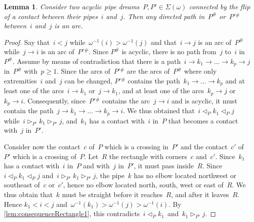 \documentclass[reqno]{amsart}
\newtheorem{lemma}[theorem]{Lemma}
\theoremstyle{definition}
\newcommand{\contact}{^\#} %
\newcommand{\acyclicPipeDreams}{\Sigma} %
\newcommand{\less}{\vartriangleleft} %
\newcommand{\more}{\vartriangleright} %
\newcommand{\contactLess}[1]{\less_{#1}} %
\newcommand{\contactMore}[1]{\more_{#1}} %
\begin{document}
\begin{lemma}
\label{lem:flippable}
Consider two acyclic pipe dreams~$P,P' \in \acyclicPipeDreams(\omega)$ connected by the flip of a contact between their pipes~$i$ and~$j$.
Then any directed path in~$P\contact$ or~$P'{}\contact$ between~$i$ and~$j$ is an arc.
\end{lemma}

\begin{proof}
Say that~$i < j$ while~$\omega^{-1}(i) > \omega^{-1}(j)$ and that~$i \to j$ is an arc of~$P\contact$ while~$j \to i$ is an arc of~$P'{}\contact$.
Since $P\contact$ is acyclic, there is no path from~$j$ to~$i$ in~$P\contact$.
Assume by means of contradiction that there is a path~$i \to k_1 \to \dots \to k_p \to j$ in~$P\contact$ with~$p \ge 1$.
Since the arcs of~$P'{}\contact$ are the arcs of~$P\contact$ where only extremities~$i$ and~$j$ can be changed, $P'{}\contact$ contains the path~$k_1 \to \dots \to k_p$ and at least one of the arcs~$i \to k_1$ or~$j \to k_1$, and at least one of the arcs~$k_p \to j$ or~$k_p \to i$.
Consequently, since~$P'{}\contact$ contains the arc~$j \to i$ and is acyclic, it must contain the path~$j \to k_1 \to \dots \to k_p \to i$.
We thus obtained that~$i \contactLess{P} k_1 \contactLess{P} j$ while~$i \contactMore{P'} k_1 \contactMore{P'} j$, and~$k_1$ has a contact with~$i$ in~$P$ that becomes a contact with~$j$ in~$P'$.

Consider now the contact~$c$ of~$P$ which is a crossing in~$P'$ and the contact~$c'$ of~$P'$ which is a crossing of~$P$.
Let~$R$ the rectangle with corners~$c$ and~$c'$.
Since~$k_1$ has a contact with~$i$ in~$P$ and with~$j$ in~$P'$, it must pass inside~$R$.
Since~$i \contactLess{P} k_1 \contactLess{P} j$ and~$i \contactMore{P'} k_1 \contactMore{P'} j$, the pipe~$k$ has no elbow located northwest or southeast of~$c$ or~$c'$, hence no elbow located north, south, west or east of~$R$.
We thus obtain that~$k$ must be straight before it reaches~$R$, and after it leaves~$R$.
Hence $k_1 < i < j$ and~$\omega^{-1}(k_1) > \omega^{-1}(j) > \omega^{-1}(i)$.
By \cref{lem:consequenceRectangle1}, this contradicts~$i \contactLess{P} k_1$~and~$k_1 \contactMore{P'} j$.
\end{proof}
\end{document}
